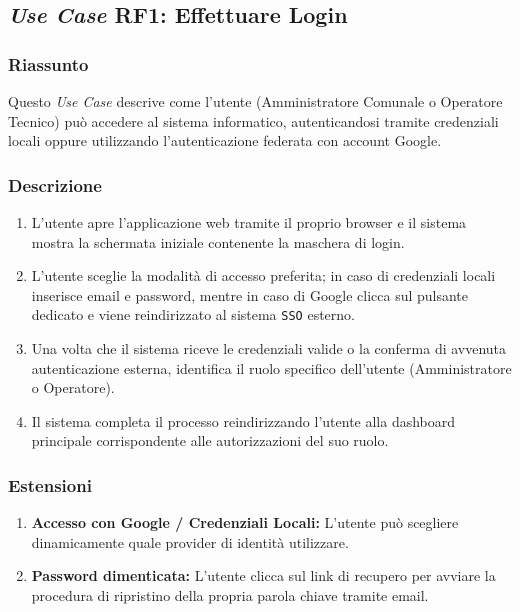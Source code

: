     \subsection*{\textit{Use Case} RF1: Effettuare Login}
        \subsubsection*{Riassunto}
            Questo \textit{Use Case} descrive come l'utente (Amministratore Comunale o Operatore Tecnico) può accedere al sistema informatico, autenticandosi tramite credenziali locali oppure utilizzando l'autenticazione federata con account Google.
        \subsubsection*{Descrizione}
            \begin{enumerate}
                \item L'utente apre l'applicazione web tramite il proprio browser e il sistema mostra la schermata iniziale contenente la maschera di login.
                \item L'utente sceglie la modalità di accesso preferita; in caso di credenziali locali inserisce email e password, mentre in caso di Google clicca sul pulsante dedicato e viene reindirizzato al sistema \texttt{SSO} esterno.
                \item Una volta che il sistema riceve le credenziali valide o la conferma di avvenuta autenticazione esterna, identifica il ruolo specifico dell'utente (Amministratore o Operatore).
                \item Il sistema completa il processo reindirizzando l'utente alla dashboard principale corrispondente alle autorizzazioni del suo ruolo.
            \end{enumerate}
        \subsubsection*{Estensioni}
            \begin{enumerate}
                \item \textbf{Accesso con Google / Credenziali Locali:} L'utente può scegliere dinamicamente quale provider di identità utilizzare.
                \item \textbf{Password dimenticata:} L'utente clicca sul link di recupero per avviare la procedura di ripristino della propria parola chiave tramite email.
            \end{enumerate}
